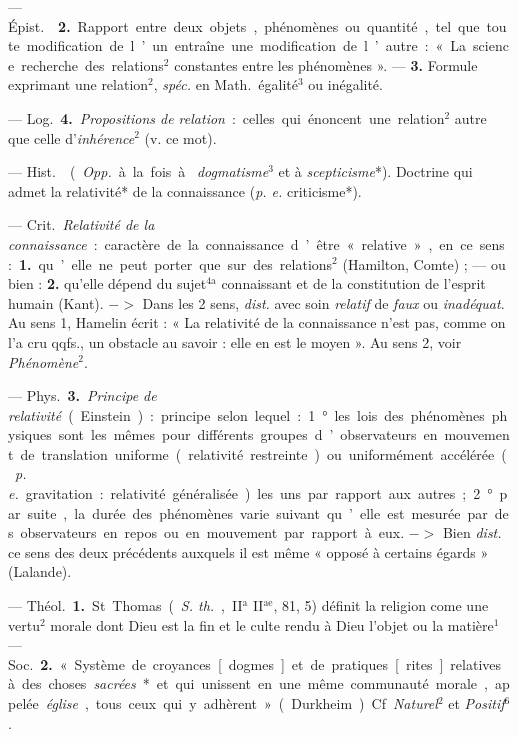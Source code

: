 \begin{itemize}[leftmargin=1cm, label=, itemsep=1pt]
— \si{Épist.}  {\bf 2.} Rapport entre
deux objets, phénomènes ou quantité,
tel que toute modification de l’un entraîne une modification de l’autre : «
La science recherche des relations$^2$ constantes entre les phénomènes ». —
 {\bf 3.} Formule exprimant une relation$^2$, {\it spéc.} en
\si{Math.} égalité$^3$ ou inégalité.

— \si{Log.} {\bf 4.} {\it Propositions de relation} : celles qui énoncent une
relation$^2$ autre que celle d’{\it inhérence}$^2$ (v. ce mot).

 — \si{Hist.}  ({\it Opp.} à la fois à {\it
dogmatisme}$^3$ et à {\it scepticisme}*). Doctrine qui admet la relativité*
de la connaissance ({\it p. e.} criticisme*).

 — \si{Crit.} {\it Relativité de la connaissance} : caractère
de la connaissance d’être « relative », en ce sens : {\bf 1.} qu’elle ne peut
porter que sur des relations$^2$ (Hamilton, Comte) ; — ou bien : {\bf 2.}
qu’elle dépend du sujet$^\text{4a}$ connaissant et de la constitution de
l'esprit humain (Kant). $->$ Dans les 2 sens, {\it dist.} avec soin {\it
relatif} de {\it faux} ou {\it inadéquat}. Au sens 1, Hamelin écrit : « La
relativité de la connaissance n’est pas, comme on l’a cru qqfs., un obstacle
au savoir : elle en est le moyen ». Au sens 2, voir {\it Phénomène}$^2$.

— \si{Phys.} {\bf 3.} {\it Principe de relativité} (Einstein) : principe
selon lequel : 1° les lois des phénomènes physiques sont les mêmes pour
différents groupes d’observateurs en mouvement de translation uniforme
(relativité restreinte) ou uniformément accélérée ({\it p. e.} gravitation :
relativité généralisée) les uns par rapport aux autres; 2° par suite, la
durée des phénomènes varie suivant qu’elle est mesurée par des observateurs
en repos ou en mouvement par rapport à eux. $->$ Bien {\it dist.} ce sens des
deux précédents auxquels il est même « opposé à certains égards » (Lalande).

 — \si{Théol.} {\bf 1.} St. Thomas ({\it S. th.}, II$^\text{a}$
II$^\text{ae}$, 81, 5) définit la religion come une vertu$^2$ morale dont
Dieu est la fin et le culte rendu à Dieu l’objet ou la matière$^1$ — \si{Soc.}
{\bf 2.} « Système de croyances [dogmes] et de pratiques [rites] relatives à
des choses {\it sacrées}* et qui unissent en une même communauté morale,
appelée {\it église}, tous ceux qui y adhèrent » (Durkheim). Cf.
{\it Naturel}$^2$ et {\it Positif}$^6$.


\end{itemize}
